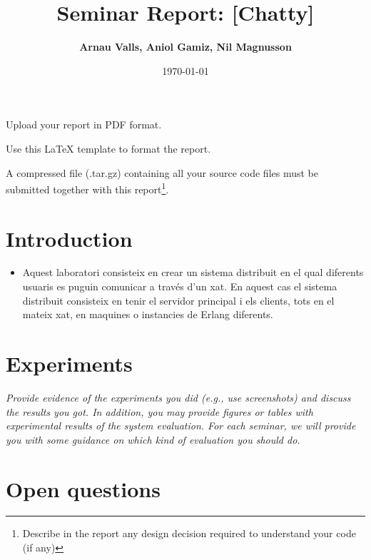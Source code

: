 \documentclass[a4paper, 10pt]{article}
\title{Seminar Report: [Chatty]}
\author{\textbf{Arnau Valls, Aniol Gamiz, Nil Magnusson}}
\date{\normalsize\today{}}
\begin{document}
\maketitle

\begin{center}
  Upload your report in PDF format.
  
  Use this LaTeX template to format the report.
  
	A compressed file (.tar.gz) containing all your source code files must be submitted together with this report\footnote{Describe in the report any design decision required to understand your code (if any)}.
\end{center}



\section{Introduction}

\begin{itemize}


\item{Aquest laboratori consisteix en crear un sistema distribuit en el qual diferents usuaris es puguin comunicar a través d'un xat. En aquest cas el sistema distribuit consisteix en tenir el servidor principal i els clients, tots en el mateix xat, en maquines o instancies de Erlang diferents.}

\end{itemize}

\section{Experiments}

\textit{Provide evidence of the experiments you did (e.g., use screenshots) and discuss the results you got. In addition, you may provide figures or tables with experimental results of the system evaluation. For each seminar, we will provide you with some guidance on which kind of evaluation you should do.}

\section{Open questions}
\end{document}
